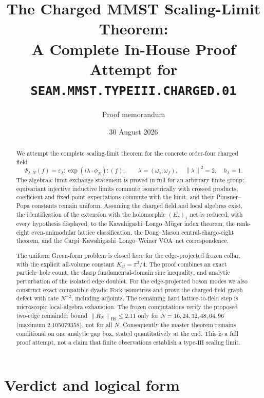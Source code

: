 \documentclass[11pt]{article}
\title{The Charged MMST Scaling-Limit Theorem:\\
A Complete In-House Proof Attempt for
\texttt{SEAM.MMST.TYPEIII.CHARGED.01}}
\author{Proof memorandum}
\date{30 August 2026}
\theoremstyle{remark}
\newcommand{\HS}{\mathrm{HS}}
\newcommand{\norm}[1]{\left\lVert#1\right\rVert}
\begin{document}
\maketitle

\begin{abstract}
We attempt the complete scaling-limit theorem for the concrete order-four
charged field
\[
 \Psi_{\lambda,N}(f)
 =\varepsilon_\lambda:\!\exp(i\lambda\cdot\phi_N)\!:(f),
 \qquad
 \lambda=(\omega_s,\omega_f),\quad
 \norm{\lambda}^2=2,\quad h_\lambda=1.
\]
The algebraic limit-exchange statement is proved in full for an arbitrary
finite group: equivariant injective inductive limits commute isometrically
with crossed products, coefficient and fixed-point expectations commute
with the limit, and their Pimsner--Popa constants remain uniform.  Assuming
the charged field and local algebras exist, the identification of the
extension with the holomorphic $(E_8)_1$ net is reduced, with every
hypothesis displayed, to the Kawahigashi--Longo--M\"uger index theorem,
the rank-eight even-unimodular lattice classification, the
Dong--Mason central-charge-eight theorem, and the
Carpi--Kawahigashi--Longo--Weiner VOA--net correspondence.

The uniform Green-form problem is closed here for the edge-projected
frozen collar, with the explicit all-volume constant
$K_G=\pi^2/4$.  The proof combines an exact particle--hole count,
the sharp fundamental-domain sine inequality, and analytic perturbation
of the isolated edge doublet.  For the edge-projected boson modes we
also construct exact compatible dyadic Fock isometries and prove the
charged-field graph defect with rate $N^{-2}$, including adjoints.
The remaining hard lattice-to-field step is microscopic local-algebra
exhaustion.  The frozen computations
verify the proposed two-edge remainder bound
$\norm{R_N}_{\HS}\le2.11$ only for
$N=16,24,32,48,64,96$ (maximum $2.105079358$), not for all $N$.
Consequently the master theorem remains conditional on one analytic
gap box, stated quantitatively at the end.  This is a full proof attempt,
not a claim that finite observations establish a type-$\mathrm{III}$
scaling limit.
\end{abstract}

\tableofcontents

\section{Verdict and logical form}
\end{document}
